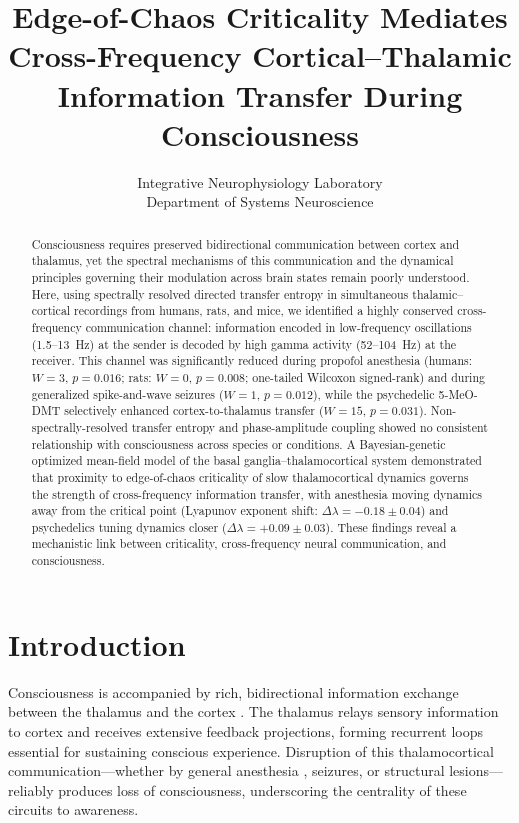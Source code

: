 \documentclass[11pt]{article}
\title{Edge-of-Chaos Criticality Mediates Cross-Frequency Cortical--Thalamic Information Transfer During Consciousness}
\author{
Integrative Neurophysiology Laboratory\\
Department of Systems Neuroscience\\
}
\date{}
\begin{document}
\maketitle

\begin{abstract}
Consciousness requires preserved bidirectional communication between cortex and thalamus, yet the spectral mechanisms of this communication and the dynamical principles governing their modulation across brain states remain poorly understood. Here, using spectrally resolved directed transfer entropy in simultaneous thalamic--cortical recordings from humans, rats, and mice, we identified a highly conserved cross-frequency communication channel: information encoded in low-frequency oscillations (1.5--13~Hz) at the sender is decoded by high gamma activity (52--104~Hz) at the receiver. This channel was significantly reduced during propofol anesthesia (humans: $W = 3$, $p = 0.016$; rats: $W = 0$, $p = 0.008$; one-tailed Wilcoxon signed-rank) and during generalized spike-and-wave seizures ($W = 1$, $p = 0.012$), while the psychedelic 5-MeO-DMT selectively enhanced cortex-to-thalamus transfer ($W = 15$, $p = 0.031$). Non-spectrally-resolved transfer entropy and phase-amplitude coupling showed no consistent relationship with consciousness across species or conditions. A Bayesian-genetic optimized mean-field model of the basal ganglia--thalamocortical system demonstrated that proximity to edge-of-chaos criticality of slow thalamocortical dynamics governs the strength of cross-frequency information transfer, with anesthesia moving dynamics away from the critical point (Lyapunov exponent shift: $\Delta\lambda = -0.18 \pm 0.04$) and psychedelics tuning dynamics closer ($\Delta\lambda = +0.09 \pm 0.03$). These findings reveal a mechanistic link between criticality, cross-frequency neural communication, and consciousness.
\end{abstract}

\section{Introduction}

Consciousness is accompanied by rich, bidirectional information exchange between the thalamus and the cortex \citep{tononi2016integrated, mashour2020conscious}. The thalamus relays sensory information to cortex and receives extensive feedback projections, forming recurrent loops essential for sustaining conscious experience. Disruption of this thalamocortical communication---whether by general anesthesia \citep{alkire2008consciousness}, seizures, or structural lesions---reliably produces loss of consciousness, underscoring the centrality of these circuits to awareness.
\end{document}
